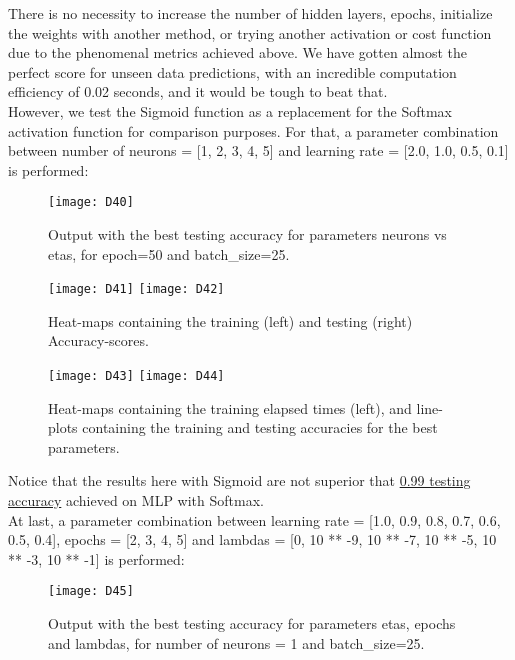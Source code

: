 There is no necessity to increase the number of hidden layers, epochs, initialize the weights with another method, or trying another activation or cost function due to the phenomenal metrics achieved above. We have gotten almost the perfect score for unseen data predictions, with an incredible computation efficiency of 0.02 seconds, and it would be tough to beat that.\\

However, we test the Sigmoid function as a replacement for the Softmax activation function for comparison purposes. For that, a parameter combination between number of neurons = [1, 2, 3, 4, 5] and learning rate = [2.0, 1.0, 0.5, 0.1] is performed:

\begin{figure}[H]
\label{fig:D25}
\centering
\texttt{[image: D40]}
\caption{Output with the best testing accuracy for parameters neurons vs etas, for epoch=50 and batch\_size=25.}
\end{figure}

\begin{figure}[H]
\label{fig:D26}
\centering
\texttt{[image: D41]}
\texttt{[image: D42]}
\caption{Heat-maps containing the training (left) and testing (right) Accuracy-scores.}
\end{figure}

\begin{figure}[H]
\label{fig:D27}
\centering
\texttt{[image: D43]}
\texttt{[image: D44]}
\caption{Heat-maps containing the training elapsed times (left), and line-plots containing the training and testing accuracies for the best parameters.}
\end{figure}

Notice that the results here with Sigmoid are not superior that \hyperref[fig:D23]{0.99 testing accuracy} achieved on MLP with Softmax.\\

At last, a parameter combination between learning rate = [1.0, 0.9, 0.8, 0.7, 0.6, 0.5, 0.4], epochs = [2, 3, 4, 5] and lambdas = [0, 10 ** -9, 10 ** -7, 10 ** -5, 10 ** -3, 10 ** -1] is performed:

\begin{figure}[H]
\label{fig:D28}
\centering
\texttt{[image: D45]}
\caption{Output with the best testing accuracy for parameters etas, epochs and lambdas, for number of neurons = 1 and batch\_size=25.}
\end{figure}

